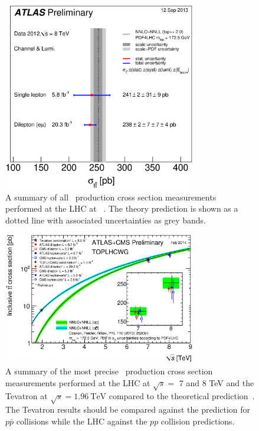 \begin{figure}[htbp]
  \centering
  \includegraphics[width=0.75\textwidth]{PartTopQuark/Plots/tt_xsec_8TeV.eps}
  \caption[A summary of all \ttbar\ production cross section measurements performed at the LHC at \cmsE.]{A summary of all \ttbar\ production cross section measurements performed at the LHC at \cmsE~\cite{TopQuark:SummaryPlots}. The theory prediction is shown as a dotted line with associated uncertainties as grey bands.}\label{fig:TopQuarkPairProduction8TeV}
\end{figure}

\begin{figure}[htbp]
  \centering
  \includegraphics[width=0.75\textwidth]{PartTopQuark/Plots/tt_xsec_vsroots.eps}
  \caption[A summary of the most precise \ttbar\ production cross section measurements performed at the LHC at $\sqrt{s}=$ 7 and 8 TeV and the Tevatron at $\sqrt{s}=\SI{1.96}{\TeV}$ compared to the theoretical prediction.]{A summary of the most precise \ttbar\ production cross section measurements performed at the LHC at $\sqrt{s}=$ 7 and 8 TeV and the Tevatron at $\sqrt{s}=\SI{1.96}{\TeV}$ compared to the theoretical prediction~\cite{TopQuark:SummaryPlots}. The Tevatron results should be compared against the prediction for $p\bar{p}$ collisions while the LHC against the $pp$ collision predictions.}\label{fig:TopQuarkPairProductionComparison}
\end{figure}

